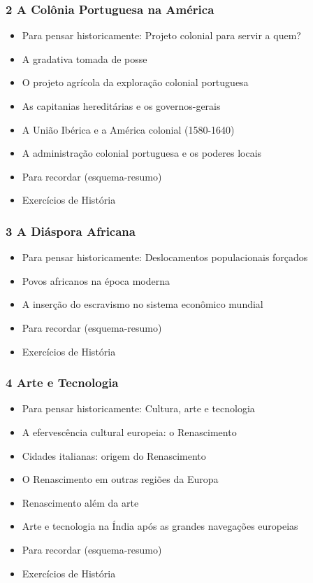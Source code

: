 \documentclass[a4paper,12pt]{article}[abntex2]
\begin{document}
\subsubsection*{2 A Colônia Portuguesa na América}

\begin{itemize}
\item Para pensar historicamente: Projeto colonial para servir a quem?
\item A gradativa tomada de posse
\item O projeto agrícola da exploração colonial portuguesa
\item As capitanias hereditárias e os governos-gerais
\item A União Ibérica e a América colonial (1580-1640)
\item A administração colonial portuguesa e os poderes locais
\item Para recordar (esquema-resumo)
\item Exercícios de História
\end{itemize}
\subsubsection*{3 A Diáspora Africana}

\begin{itemize}
\item Para pensar historicamente: Deslocamentos populacionais forçados
\item Povos africanos na época moderna
\item A inserção do escravismo no sistema econômico mundial
\item Para recordar (esquema-resumo)
\item Exercícios de História
\end{itemize}
\subsubsection*{4 Arte e Tecnologia}

\begin{itemize}
\item Para pensar historicamente: Cultura, arte e tecnologia
\item A efervescência cultural europeia: o Renascimento
\item Cidades italianas: origem do Renascimento
\item O Renascimento em outras regiões da Europa
\item Renascimento além da arte
\item Arte e tecnologia na Índia após as grandes navegações europeias
\item Para recordar (esquema-resumo)
\item Exercícios de História
\end{itemize}
\end{document}

